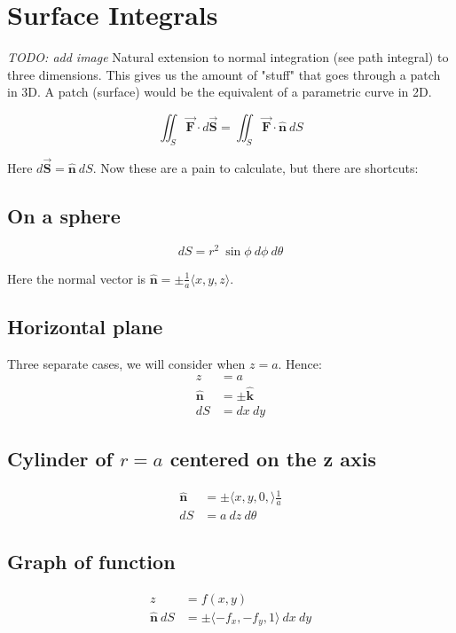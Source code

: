 \documentclass{article}
\newcommand{\bm}[1]{\mathbf{#1}}
\newcommand{\vf}[1]{\vec{\mathbf{#1}}}
\newcommand{\norm}{\hat{\bm{n}}}
\begin{document}
\section{Surface Integrals}
\textit{TODO: add image}
Natural extension to normal integration (see path integral) to three dimensions. This gives us the amount of "stuff" that goes through a patch in 3D. A patch (surface) would be the equivalent of a parametric curve in 2D.

\begin{equation}
    \iint_S \vf{F} \cdot d\vf{S} = \iint_S \vf{F} \cdot \norm\ dS
\end{equation}

Here $d\vf{S} = \norm\ dS$. Now these are a pain to calculate, but there are shortcuts:

\subsection{On a sphere}
\begin{equation*}
    dS = r^2\ \sin\phi\ d\phi\ d\theta 
\end{equation*}

Here the normal vector is $\norm = \pm \frac{1}{a} \langle x, y, z \rangle$.

\subsection{Horizontal plane}
Three separate cases, we will consider when $z = a$. Hence:
\begin{align*}
    z &= a \\
    \norm &= \pm \mathbf{\hat{k}} \\
    dS &= dx\ dy
\end{align*}

\subsection{Cylinder of $r = a$ centered on the z axis}
\begin{align*}
    \norm &= \pm \langle x, y, 0, \rangle \frac{1}{a} \\
    dS &= a\ dz\ d\theta
\end{align*}

\subsection{Graph of function}
\begin{align*}
    z &= f(x, y) \\
    \norm\ dS &= \pm \langle -f_x, -f_y, 1\rangle\ dx\ dy
\end{align*}
\end{document}
